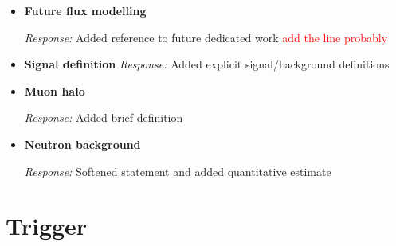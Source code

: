\documentclass[11pt]{article}
\begin{document}
\begin{itemize}[leftmargin=*]
\textit{Response:} Included.

\item \textbf{Future flux modelling}

\textit{Response:} Added reference to future dedicated work \textcolor{red}{add the line probably}


\item \textbf{Signal definition}
\textit{Response:} Added explicit signal/background definitions


\item \textbf{Muon halo}

\textit{Response:} Added brief definition


\item \textbf{Neutron background}

\textit{Response:} Softened statement and added quantitative estimate

\end{itemize}

\section*{Trigger}
\end{document}
